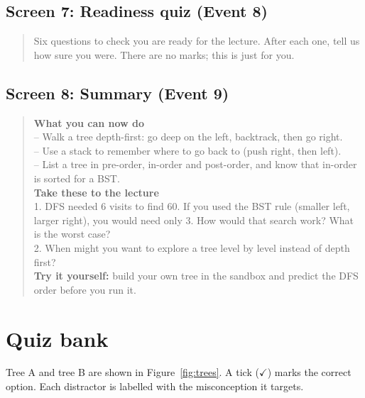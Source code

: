 \documentclass[11pt,a4paper]{article}
\begin{document}
\subsection*{Screen 7: Readiness quiz (Event 8)}
\begin{quote}\sffamily\small
Six questions to check you are ready for the lecture. After each one, tell us how sure you were.
There are no marks; this is just for you.
\end{quote}

\subsection*{Screen 8: Summary (Event 9)}
\begin{quote}\sffamily\small
\textbf{What you can now do}\\
-- Walk a tree depth-first: go deep on the left, backtrack, then go right.\\
-- Use a stack to remember where to go back to (push right, then left).\\
-- List a tree in pre-order, in-order and post-order, and know that in-order is sorted for a BST.\\[4pt]
\textbf{Take these to the lecture}\\
1. DFS needed 6 visits to find 60. If you used the BST rule (smaller left, larger right), you would
need only 3. How would that search work? What is the worst case?\\
2. When might you want to explore a tree level by level instead of depth first?\\[4pt]
\textbf{Try it yourself:} build your own tree in the sandbox and predict the DFS order before you run it.
\end{quote}

\section{Quiz bank}
\label{app:quiz}

Tree A and tree B are shown in Figure~\ref{fig:trees}. A tick ($\checkmark$) marks the correct
option. Each distractor is labelled with the misconception it targets.

\newcommand{\qitem}[4]{%
  \par\medskip\noindent\textbf{#1}\quad #2\par\nopagebreak
  \begin{tabularx}{\textwidth}{@{}p{3.6cm} L@{}}
    \toprule
    \textbf{Option} & \textbf{Feedback} \\
    \midrule
    #3
    \bottomrule
  \end{tabularx}\par
  \ifx&#4&\else\noindent\small\emph{#4}\par\fi}
\end{document}
